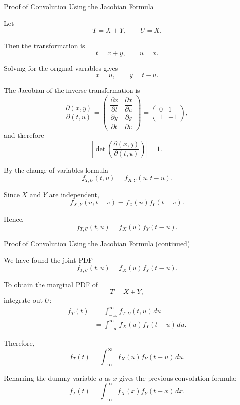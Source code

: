 \begin{frame}{Proof of Convolution Using the Jacobian Formula}

\small

Let
\[
T=X+Y,
\qquad
U=X.
\]

Then the transformation is
\[
t=x+y,
\qquad
u=x.
\]

Solving for the original variables gives
\[
{
x=u,
\qquad
y=t-u.
}
\]

The Jacobian of the inverse transformation is
\[
\frac{\partial(x,y)}{\partial(t,u)}
=
\begin{pmatrix}
\dfrac{\partial x}{\partial t} &
\dfrac{\partial x}{\partial u}\\[6pt]
\dfrac{\partial y}{\partial t} &
\dfrac{\partial y}{\partial u}
\end{pmatrix}
=
\begin{pmatrix}
0 & 1\\
1 & -1
\end{pmatrix},
\]
and therefore
\[
\left|
\det\left(
\frac{\partial(x,y)}{\partial(t,u)}
\right)
\right|
=1.
\]

By the change-of-variables formula,
\[
f_{T,U}(t,u)
=
f_{X,Y}(u,t-u).
\]

Since $X$ and $Y$ are independent,
\[
f_{X,Y}(u,t-u)
=
f_X(u)f_Y(t-u).
\]

Hence,
\[
{
f_{T,U}(t,u)
=
f_X(u)f_Y(t-u).
}
\]

\end{frame}


\begin{frame}{Proof of Convolution Using the Jacobian Formula (continued)}

\small

We have found the joint PDF
\[
f_{T,U}(t,u)
=
f_X(u)f_Y(t-u).
\]

To obtain the marginal PDF of
\[
T=X+Y,
\]
integrate out $U$:
\[
\begin{aligned}
f_T(t)
&=
\int_{-\infty}^{\infty}
f_{T,U}(t,u)\,du\\
&=
\int_{-\infty}^{\infty}
f_X(u)f_Y(t-u)\,du.
\end{aligned}
\]

Therefore,
\[
{
f_T(t)
=
\int_{-\infty}^{\infty}
f_X(u)f_Y(t-u)\,du.
}
\]

Renaming the dummy variable $u$ as $x$ gives the previous convolution formula:
\[
{
f_T(t)
=
\int_{-\infty}^{\infty}
f_X(x)f_Y(t-x)\,dx.
}
\]

\end{frame}



